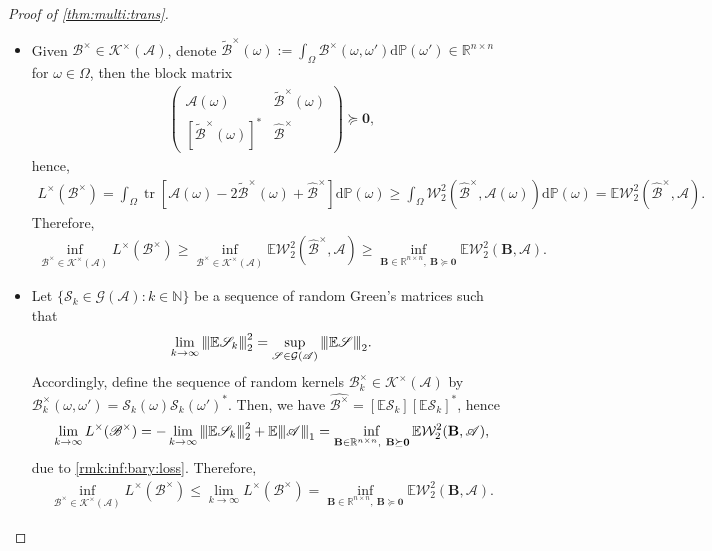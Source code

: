 \documentclass[noinfoline]{imsart}\setcounter{tocdepth}{2}
\renewcommand{\b}[1]{\mathbb{#1}} %
\newcommand{\m}[1]{\mathbf{#1}} %
\newcommand{\s}[1]{\mathscr{#1}} %
\renewcommand{\c}[1]{\mathcal{#1}} %
\newcommand{\rd}{\mathrm{d}} %
\DeclareMathOperator*{\tr}{tr}
\newcommand{\vertii}[1]{{\vert\kern-0.25ex\vert\kern-0.25ex\vert #1 
    \vert\kern-0.25ex\vert\kern-0.25ex\vert}} %
\theoremstyle{plain}
\begin{document}
\begin{proof}[Proof of \cref{thm:multi:trans}]
\begin{itemize}[leftmargin = *]
\item [($\ge$)] Given $\s{B}^{\times} \in \c{K}^{\times}(\s{A})$, denote $\tilde{\s{B}}^{\times}(\omega) := \int_{\Omega} \s{B}^{\times}(\omega, \omega') \rd \b{P}(\omega') \in \b{R}^{n \times n}$ for $\omega \in \Omega$, then the block matrix
\begin{align*}
    \begin{pmatrix}
    \s{A}(\omega) & \tilde{\s{B}}^{\times}(\omega) \\
    [\tilde{\s{B}}^{\times}(\omega)]^{*} & \widehat{\s{B}}^{\times}
    \end{pmatrix} \succeq \m{0},
\end{align*}
hence,
\begin{align*}
    L^{\times}(\s{B}^{\times}) = \int_{\Omega} \tr[\s{A}(\omega) - 2 \tilde{\s{B}}^{\times}(\omega) + \widehat{\s{B}}^{\times}] \rd \b{P}(\omega) \ge \int_{\Omega} \c{W}_{2}^{2}(\widehat{\s{B}}^{\times}, \s{A}(\omega)) \rd \b{P}(\omega) = \b{E} \c{W}_{2}^{2}(\widehat{\s{B}}^{\times}, \s{A}).
\end{align*}
Therefore,
\begin{align*}
    \inf_{\s{B}^{\times} \in \c{K}^{\times}(\s{A})} L^{\times}(\s{B}^{\times}) \ge \inf_{\s{B}^{\times} \in \c{K}^{\times}(\s{A})} \b{E} \c{W}_{2}^{2}(\widehat{\s{B}}^{\times}, \s{A}) \ge \inf_{\m{B} \in \b{R}^{n \times n}, \ \m{B} \succeq \m{0}}  \b{E} \c{W}_{2}^{2}(\m{B}, \s{A}).
\end{align*}
\item [($\le$)] Let $\{\s{S}_{k} \in \c{G}(\s{A}) : k \in \b{N}\}$ be a sequence of random Green's matrices such that
\begin{align*}
    \lim_{k \to \infty} \vertii{\b{E} \s{S}_{k}}_{2}^{2} = \sup_{\s{S} \in \c{G}(\s{A})} \vertii{\b{E} \s{S}}_{2}.
\end{align*}
Accordingly, define the sequence of random kernels $\s{B}_{k}^{\times} \in \c{K}^{\times}(\s{A})$ by $\s{B}_{k}^{\times}(\omega, \omega') = \s{S}_{k}(\omega) \s{S}_{k}(\omega')^{*}$. Then, we have $\widehat{\s{B}^{\times}} = [\b{E} \s{S}_{k}] [\b{E} \s{S}_{k}]^{*}$, hence
\begin{align*}
    \lim_{k \to \infty} L^{\times}(\s{B}^{\times}) = - \lim_{k \to \infty} \vertii{\b{E} \s{S}_{k}}_{2}^{2} + \b{E} \vertii{\s{A}}_{1} = \inf_{\m{B} \in \b{R}^{n \times n}, \ \m{B} \succeq \m{0}}  \b{E} \c{W}_{2}^{2}(\m{B}, \s{A}),
\end{align*}
due to \cref{rmk:inf:bary:loss}. Therefore,
\begin{align*}
    \inf_{\s{B}^{\times} \in \c{K}^{\times}(\s{A})} L^{\times}(\s{B}^{\times}) \le \lim_{k \to \infty} L^{\times}(\s{B}^{\times}) = \inf_{\m{B} \in \b{R}^{n \times n}, \ \m{B} \succeq \m{0}}  \b{E} \c{W}_{2}^{2}(\m{B}, \s{A}).         
\end{align*}
\end{itemize}


\end{proof}
\end{document}
